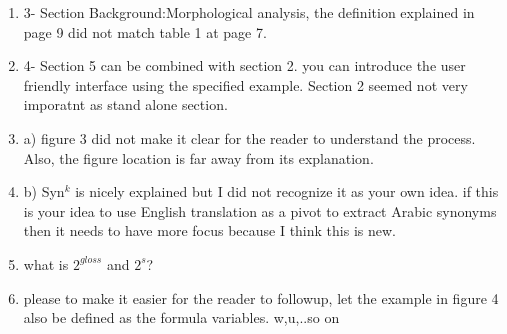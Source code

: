 \begin{enumerate}[leftmargin=0mm,label=\bfseries CommentR3.\arabic*]
\item \label{Review.3.10}
3- Section Background:Morphological analysis, 
the definition explained in page 9 did not match table 1 at page 7.



\item \label{Review.3.11}
4- Section 5 can be combined with section 2. 
you can introduce the user friendly interface using the 
specified example. 
Section 2 seemed not very imporatnt as stand alone section.



\item \label{Review.3.12}
a) figure 3 did not make it clear for the reader to 
understand the process. Also, the figure location is far 
away from its explanation.


\item \label{Review.3.13}
b) Syn$^k$ is nicely explained but I did not recognize it as 
your own idea. if this is your idea to use English translation 
as a pivot to extract Arabic synonyms then it needs to have 
more focus because I think this is new.


\item \label{Review.3.14}
what is $2^{gloss}$ and $2^{s}$?



\item \label{Review.3.15}
please to make it easier for the reader to followup, 
let the example in figure 4 also be defined as the formula 
variables. w,{u},..so on


\end{enumerate}
